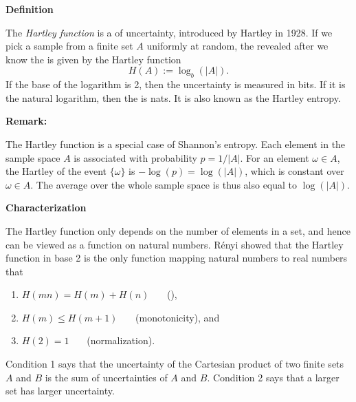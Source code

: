 \documentclass[12pt]{article}
\begin{document}
{\bf Definition}

The {\it Hartley function} is a  of uncertainty, introduced by Hartley in 1928. If we pick a sample from a finite set $A$ uniformly at random, the  revealed after we know the  is given by the Hartley function
\[
  H(A) := \log_b(|A|).
\]
If the base of the logarithm is 2, then the uncertainty is
measured in bits. If it is the natural logarithm, then the  is nats. It is also known as the Hartley entropy. 

\bigskip

{\bf Remark:}

 The Hartley function is a special case of Shannon's entropy. Each element  in the sample space $A$ is associated with probability $p=1/|A|$. For an element $\omega\in A$, the Hartley  of the event $\{\omega\}$ is $-\log(p)=\log(|A|)$, which is constant over $\omega\in A$. The average  over the whole sample space is thus also equal to $\log(|A|)$.

\bigskip

{\bf Characterization}

The Hartley function only depends on the number of elements in a
set, and hence can be viewed as a function on natural numbers.
R\'enyi showed that the Hartley function in base 2 is the only
function mapping natural numbers to real numbers that
\begin{enumerate}
\item $H(mn) = H(m)+H(n)$ \ \ \ (),

\item $H(m) \leq H(m+1)$ \ \ \ (monotonicity), and

\item $H(2)=1$ \ \ \ (normalization).
\end{enumerate}

Condition 1 says that the uncertainty of the Cartesian product of
two finite sets $A$ and $B$ is the sum of uncertainties of $A$ and
$B$. Condition 2 says that a larger set has larger uncertainty.
\end{document}
